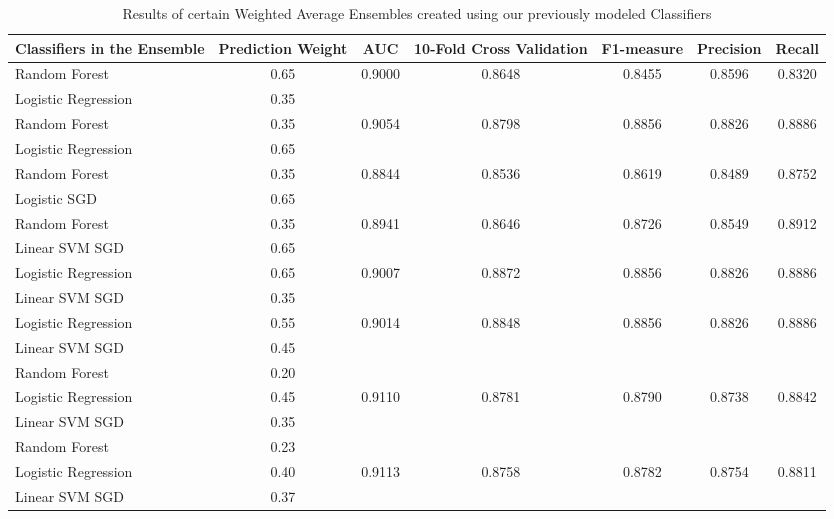 \begin{table*}[!ht]
    \centering
    \caption{Results of certain Weighted Average Ensembles created using our previously modeled Classifiers\label{tab:evaluation-ensembles}}
    \begin{tabular}{ l| S[table-format=1.4] |S[table-format=1.4] |S[table-format=1.4] | S[table-format=1.4] |S[table-format=1.4] |S[table-format=1.4] }
    \hline
        \bf{Classifiers in the Ensemble} & {\bf{Prediction Weight}} & {\bf{AUC}} & {\bf{10-Fold Cross Validation}} & {\bf{F1-measure}} & {\bf{Precision}} & {\bf{Recall}} \\
    \hline
        Random Forest & 0.65 & 0.9000 & 0.8648 & 0.8455 & 0.8596 & 0.8320 \\ 
        Logistic Regression & 0.35 &  &  &  &  & \\
    \hline
        Random Forest & 0.35 & 0.9054 & 0.8798 & 0.8856 & 0.8826 & 0.8886\\
        Logistic Regression & 0.65 &  &  &  &  & \\
    \hline
        Random Forest & 0.35 & 0.8844 & 0.8536 & 0.8619 & 0.8489 & 0.8752 \\
        Logistic SGD & 0.65 &  &  &  &  & \\
    \hline
        Random Forest & 0.35 & 0.8941 & 0.8646 & 0.8726 & 0.8549 & 0.8912 \\
        Linear SVM SGD & 0.65 &  &  &  &  & \\
    \hline
        Logistic Regression & 0.65 & 0.9007 & 0.8872 & 0.8856 & 0.8826 & 0.8886 \\
        Linear SVM SGD & 0.35 &  &  &  &  & \\
    \hline
        Logistic Regression & 0.55 & 0.9014 & 0.8848 & 0.8856 & 0.8826 & 0.8886 \\
        Linear SVM SGD & 0.45 &  &  &  &  & \\
    \hline
        Random Forest & 0.20 &  &  &  &  & \\ 
        Logistic Regression & 0.45 & 0.9110 & 0.8781 & 0.8790 & 0.8738 & 0.8842 \\
        Linear SVM SGD & 0.35 &  &  &  &  & \\
    \hline
        Random Forest & 0.23 &  &  &  &  & \\ 
        Logistic Regression & 0.40 & 0.9113 & 0.8758 & 0.8782 & 0.8754 & 0.8811 \\
        Linear SVM SGD & 0.37 &  &  &  &  & \\
    \hline
    \end{tabular}
\end{table*}

